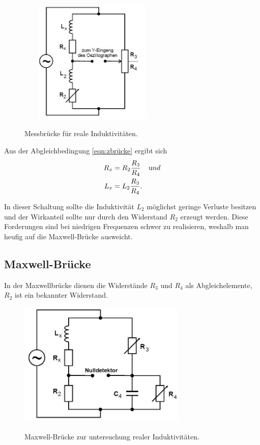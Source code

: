 \begin{figure}[H]
  \centering
  \includegraphics[width=7cm,height=6cm]{induktivitat.JPG}
  \caption{Messbrücke für reale Induktivitäten.}
  \label{fig:induktivitat}
  \cite{skript}
\end{figure}
Aus der Abgleichbedingung \ref{eqn:zbrücke} ergibt sich
\begin{align}
  R_{x} &=R_{2}\frac{R_{3}}{R_{4}} \;\;\;\; \text und \\
  L_{x} &=L_{2}\frac{R_{3}}{R_{4}}.
  \label{eqn:lx}
\end{align}

\noindent In dieser Schaltung sollte die Induktivität $L_{2}$ möglichst geringe
Verluste besitzen und der Wirkanteil sollte nur durch den Widerstand $R_{2}$ erzeugt werden.
Diese Forderungen sind bei niedrigen Frequenzen schwer zu realisieren, weshalb
man heufig auf die Maxwell-Brücke ausweicht.

\subsection{Maxwell-Brücke}
In der Maxwellbrücke dienen die Widerstände $R_{3}$ und $R_{4}$ als Abgleichelemente,
$R_{2}$ ist ein bekannter Widerstand.

\begin{figure}[H]
  \centering
  \includegraphics[width=8cm,height=6cm]{maxwell.JPG}
  \caption{Maxwell-Brücke zur untersuchung realer Induktivitäten.}
  \label{fig:maxwell}
  \cite{skript}
\end{figure}

